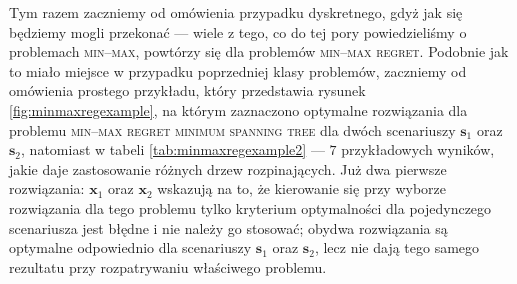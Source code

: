 Tym razem zaczniemy od omówienia przypadku dyskretnego, gdyż jak się będziemy mogli przekonać --- wiele z tego, co do tej pory powiedzieliśmy o problemach \textsc{min--max}, powtórzy się dla problemów \textsc{min--max regret}. Podobnie jak to miało miejsce w przypadku poprzedniej klasy problemów, zaczniemy od omówienia prostego przykładu, który przedstawia rysunek \ref{fig:minmaxregexample}, na którym zaznaczono optymalne rozwiązania dla problemu \textsc{min--max regret minimum spanning tree} dla dwóch scenariuszy $\textbf{s}_{1}$ oraz $\textbf{s}_{2}$, natomiast w tabeli \ref{tab:minmaxregexample2} --- $7$ przykładowych wyników, jakie daje zastosowanie różnych drzew rozpinających. Już dwa pierwsze rozwiązania: $\textbf{x}_{1}$ oraz $\textbf{x}_{2}$ wskazują na to, że kierowanie się przy wyborze rozwiązania dla tego problemu tylko kryterium optymalności dla pojedynczego scenariusza jest błędne i nie należy go stosować; obydwa rozwiązania są optymalne odpowiednio dla scenariuszy $\textbf{s}_{1}$ oraz $\textbf{s}_{2}$, lecz nie dają tego samego rezultatu przy rozpatrywaniu właściwego problemu.

